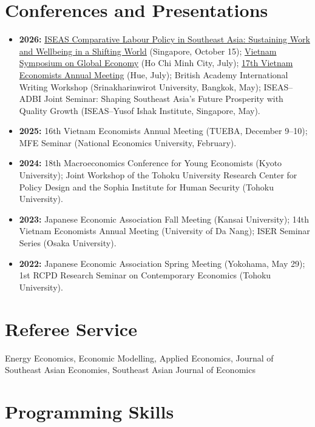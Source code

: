 \documentclass[12pt]{article}
\begin{document}

\section{Conferences and Presentations}

\begin{itemize}
\item[] \textbf{2026:} \href{https://www.iseas.edu.sg/mec-events/comparative-labour-policy-in-southeast-asia-sustaining-work-and-wellbeing-in-a-shifting-world/}{ISEAS Comparative Labour Policy in Southeast Asia: Sustaining Work and Wellbeing in a Shifting World} (Singapore, October 15);
\href{https://vsge2026.sciencesconf.org/index}{Vietnam Symposium on Global Economy} (Ho Chi Minh City, July);
\href{https://veam.org/}{17th Vietnam Economists Annual Meeting} (Hue, July);
British Academy International Writing Workshop (Srinakharinwirot University, Bangkok, May);
ISEAS--ADBI Joint Seminar: Shaping Southeast Asia's Future Prosperity with Quality Growth (ISEAS--Yusof Ishak Institute, Singapore, May).
\item[] \textbf{2025:} 16th Vietnam Economists Annual Meeting (TUEBA, December 9--10);
MFE Seminar (National Economics University, February).
\item[] \textbf{2024:} 18th Macroeconomics Conference for Young Economists (Kyoto University);
Joint Workshop of the Tohoku University Research Center for Policy Design and the Sophia Institute for Human Security (Tohoku University).
\item[] \textbf{2023:} Japanese Economic Association Fall Meeting (Kansai University);
14th Vietnam Economists Annual Meeting (University of Da Nang);
ISER Seminar Series (Osaka University).
\item[] \textbf{2022:} Japanese Economic Association Spring Meeting (Yokohama, May 29);
1st RCPD Research Seminar on Contemporary Economics (Tohoku University).
\end{itemize}

\section{Referee Service}

Energy Economics, Economic Modelling, Applied Economics, Journal of Southeast Asian Economies, Southeast Asian Journal of Economics

\section{Programming Skills}
\end{document}
